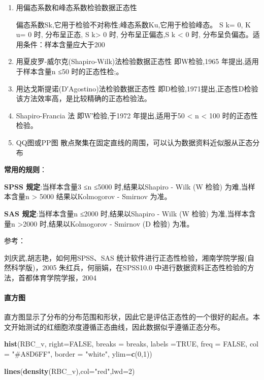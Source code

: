 \documentclass[
]{article}
\newenvironment{Shaded}{\begin{snugshade}}{\end{snugshade}}
\newcommand{\DataTypeTok}[1]{\textcolor[rgb]{0.13,0.29,0.53}{#1}}
\newcommand{\DecValTok}[1]{\textcolor[rgb]{0.00,0.00,0.81}{#1}}
\newcommand{\KeywordTok}[1]{\textcolor[rgb]{0.13,0.29,0.53}{\textbf{#1}}}
\newcommand{\NormalTok}[1]{#1}
\newcommand{\OtherTok}[1]{\textcolor[rgb]{0.56,0.35,0.01}{#1}}
\newcommand{\StringTok}[1]{\textcolor[rgb]{0.31,0.60,0.02}{#1}}
\begin{document}
\begin{enumerate}
\def\labelenumi{\arabic{enumi}.}
\item
  用偏态系数和峰态系数检验数据正态性

  偏态系数Sk,它用于检验不对称性;峰态系数Ku,它用于检验峰态。 S k= 0, K u= 0 时, 分布呈正态, S k\textgreater{} 0 时, 分布呈正偏态,S k \textless{} 0 时, 分布呈负偏态。适用条件：样本含量应大于200
\item
  用夏皮罗-威尔克(Shapiro-Wilk)法检验数据正态性
  即W检验,1965 年提出,适用于样本含量n ≤50 时的正态性检;。
\item
  用达戈斯提诺(D′Agostino)法检验数据正态性
  即D检验,1971提出,正态性D检验该方法效率高，是比较精确的正态检验法。
\item
  Shapiro-Francia 法
  即W′检验,于1972 年提出,适用于50 \textless{} n \textless{} 100 时的正态性检验。
\item
  QQ图或PP图
  散点聚集在固定直线的周围，可以认为数据资料近似服从正态分布
\end{enumerate}

\textbf{常用的规则}：

\textbf{SPSS 规定}:当样本含量3 ≤n ≤5000 时,结果以Shapiro - Wilk (W 检验) 为难,当样本含量n \textgreater{} 5000 结果以Kolmogorov - Smirnov 为准。

\textbf{SAS 规定}:当样本含量n ≤2000 时,结果以Shapiro - Wilk (W 检验) 为准,当样本含量n \textgreater2000 时,结果以Kolmogorov - Smirnov (D 检验) 为准。

参考：

刘庆武,胡志艳，如何用SPSS、SAS 统计软件进行正态性检验，湘南学院学报(自然科学版)，2005
朱红兵，何丽娟，在SPSS10.0 中进行数据资料正态性检验的方法，首都体育学院学报，2004

\hypertarget{ux76f4ux65b9ux56fe}{%
\paragraph{直方图}\label{ux76f4ux65b9ux56fe}}

直方图显示了分布的分布范围和形状，因此它是评估正态性的一个很好的起点。本文开始测试的红细胞浓度遵循正态曲线，因此数据似乎遵循正态分布。

\begin{Shaded}
\begin{Highlighting}[]
\KeywordTok{hist}\NormalTok{(RBC_v, }\DataTypeTok{right=}\OtherTok{FALSE}\NormalTok{, }
      \DataTypeTok{breaks =}\NormalTok{ breaks, }\DataTypeTok{labels =}\OtherTok{TRUE}\NormalTok{, }
      \DataTypeTok{freq =} \OtherTok{FALSE}\NormalTok{, }\DataTypeTok{col =} \StringTok{"#A8D6FF"}\NormalTok{, }
      \DataTypeTok{border =} \StringTok{"white"}\NormalTok{, }\DataTypeTok{ylim=}\KeywordTok{c}\NormalTok{(}\DecValTok{0}\NormalTok{,}\DecValTok{1}\NormalTok{))}

\KeywordTok{lines}\NormalTok{(}\KeywordTok{density}\NormalTok{(RBC_v),}\DataTypeTok{col=}\StringTok{"red"}\NormalTok{,}\DataTypeTok{lwd=}\DecValTok{2}\NormalTok{)}
\end{Highlighting}
\end{Shaded}
\end{document}
